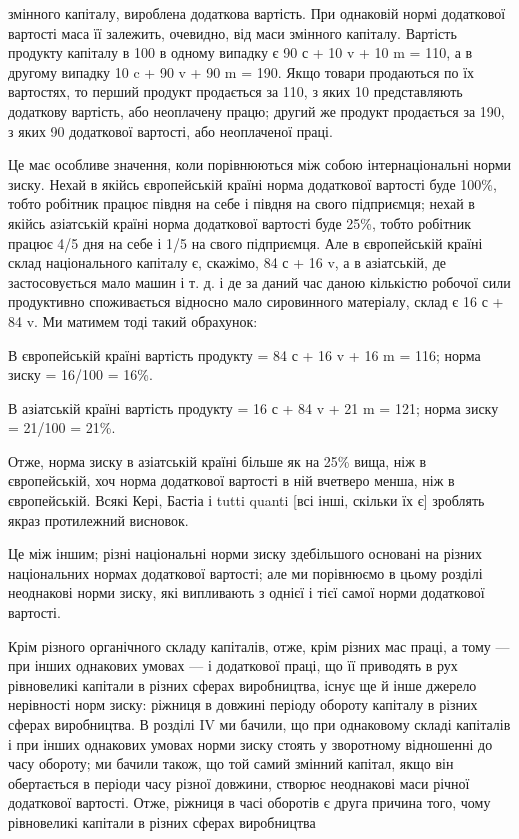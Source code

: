 \parcont{}  %
змінного капіталу, вироблена додаткова вартість. При однаковій
нормі додаткової вартості маса її залежить, очевидно, від маси
змінного капіталу. Вартість продукту капіталу в 100 в одному
випадку є 90 с + 10 v + 10 m = 110, а в другому випадку 10 c + 90 v + 90 m = 190. Якщо товари
продаються по їх вартостях,
то перший продукт продається за 110, з яких 10 представляють додаткову вартість, або неоплачену
працю; другий же
продукт продається за 190, з яких 90 додаткової вартості, або
неоплаченої праці.

Це має особливе значення, коли порівнюються між собою
інтернаціональні норми зиску. Нехай в якійсь європейській країні
норма додаткової вартості буде 100\%, тобто робітник працює
півдня на себе і півдня на свого підприємця; нехай в якійсь
азіатській країні норма додаткової вартості буде 25\%, тобто робітник працює 4/5 дня на себе і 1/5 на
свого підприємця. Але
в європейській країні склад національного капіталу є, скажімо,
84 с + 16 v, а в азіатській, де застосовується мало машин і т. д.
і де за даний час даною кількістю робочої сили продуктивно
споживається відносно мало сировинного матеріалу, склад є
16 с + 84 v. Ми матимем тоді такий обрахунок:

В європейській країні вартість продукту = 84 с + 16 v + 16 m = 116; норма зиску = 16/100 = 16\%.

В азіатській країні вартість продукту = 16 с + 84 v + 21 m = 121; норма зиску = 21/100 = 21\%.

Отже, норма зиску в азіатській країні більше як на 25\% вища, ніж в європейській, хоч норма
додаткової вартості в ній
вчетверо менша, ніж в європейській. Всякі Кері, Бастіа і tutti quanti [всі інші, скільки їх є]
зроблять якраз протилежний висновок.

Це між іншим; різні національні норми зиску здебільшого
основані на різних національних нормах додаткової вартості;
але ми порівнюємо в цьому розділі неоднакові норми зиску,
які випливають з однієї і тієї самої норми додаткової вартості.

Крім різного органічного складу капіталів, отже, крім різних
мас праці, а тому — при інших однакових умовах — і додаткової
праці, що її приводять в рух рівновеликі капітали в різних сферах
виробництва, існує ще й інше джерело нерівності норм зиску:
ріжниця в довжині періоду обороту капіталу в різних сферах
виробництва. В розділі IV ми бачили, що при однаковому складі
капіталів і при інших однакових умовах норми зиску стоять у зворотному відношенні до часу обороту;
ми бачили також, що
той самий змінний капітал, якщо він обертається в періоди
часу різної довжини, створює неоднакові маси річної додаткової вартості. Отже, ріжниця в часі
оборотів є друга причина
того, чому рівновеликі капітали в різних сферах виробництва
\parbreak{}  %
